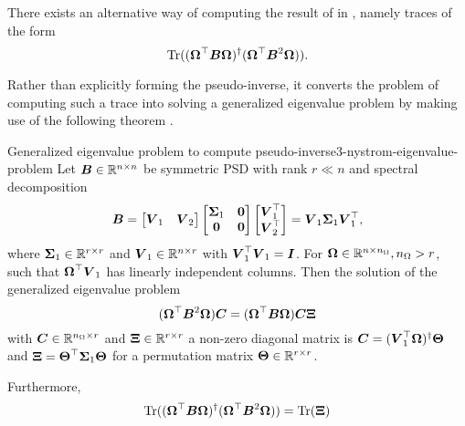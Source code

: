 There exists an alternative way of computing the result of 
in , namely traces of the form
\begin{equation}
    \operatorname{Tr}((\boldsymbol{\Omega}^{\top} \boldsymbol{B} \boldsymbol{\Omega})^{\dagger}(\boldsymbol{\Omega}^{\top} \boldsymbol{B}^2 \boldsymbol{\Omega})).
    \label{equ:3-nystrom-trace-pseudo-inverse}
\end{equation}

Rather than explicitly forming the pseudo-inverse,
it converts the problem of computing such a trace into solving a generalized
eigenvalue problem by making use of the following theorem \cite[theorem~3]{lin2017randomized}.

\begin{theorem}{Generalized eigenvalue problem to compute pseudo-inverse}{3-nystrom-eigenvalue-problem}
    Let $\boldsymbol{B} \in \mathbb{R}^{n \times n}$ be symmetric \gls{PSD} with rank $r \ll n$ and
    spectral decomposition 
    \begin{equation}
        \boldsymbol{B}
        = \begin{bmatrix} \boldsymbol{V}_1 & \boldsymbol{V}_2 \end{bmatrix} 
          \begin{bmatrix} \boldsymbol{\Sigma}_1 & \boldsymbol{0} \\ \boldsymbol{0} & \boldsymbol{0} \end{bmatrix} 
          \begin{bmatrix} \boldsymbol{V}_1^{\top} \\ \boldsymbol{V}_2^{\top} \end{bmatrix}
        = \boldsymbol{V}_1 \boldsymbol{\Sigma}_1 \boldsymbol{V}_1^{\top},
        \label{equ:3-nystrom-eigenvalue-problem-spectral-decomposition}
    \end{equation}
    where $\boldsymbol{\Sigma}_1 \in \mathbb{R}^{r \times r}$ and
    $\boldsymbol{V}_1 \in \mathbb{R}^{n \times r}$ with $\boldsymbol{V}_1^{\top} \boldsymbol{V}_1 = \boldsymbol{I}$.
    For $\boldsymbol{\Omega} \in \mathbb{R}^{n \times n_{\Omega}}, n_{\Omega} > r$,
    such that $\boldsymbol{\Omega}^{\top} \boldsymbol{V}_1$ has linearly independent columns.
    Then the solution of the generalized eigenvalue problem
    \begin{equation}
        (\boldsymbol{\Omega}^{\top} \boldsymbol{B}^2 \boldsymbol{\Omega}) \boldsymbol{C} = (\boldsymbol{\Omega}^{\top} \boldsymbol{B} \boldsymbol{\Omega}) \boldsymbol{C}  \boldsymbol{\Xi}
        \label{equ:3-nystrom-low-rank-eigenvalue-problem}
    \end{equation}
    with $\boldsymbol{C} \in \mathbb{R}^{n_{\Omega} \times r}$ and $\boldsymbol{\Xi} \in \mathbb{R}^{r \times r}$ a 
    non-zero diagonal matrix is $\boldsymbol{C} = (\boldsymbol{V}_1^{\top} \boldsymbol{\Omega})^{\dagger} \boldsymbol{\Theta}$
    and $\boldsymbol{\Xi} = \boldsymbol{\Theta}^{\top} \boldsymbol{\Sigma}_1 \boldsymbol{\Theta}$
    for a permutation matrix $\boldsymbol{\Theta} \in \mathbb{R}^{r \times r}$.

    Furthermore,
    \begin{equation}
        \operatorname{Tr}((\boldsymbol{\Omega}^{\top} \boldsymbol{B} \boldsymbol{\Omega})^{\dagger}(\boldsymbol{\Omega}^{\top} \boldsymbol{B}^2 \boldsymbol{\Omega})) = \operatorname{Tr}(\boldsymbol{\Xi})
        \label{equ:3-nystrom-low-rank-trace-equalities}
    \end{equation}
\end{theorem}
